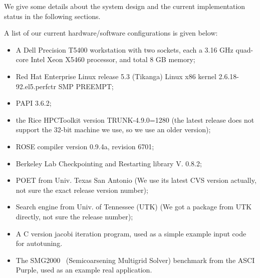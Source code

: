 We give some details about the system design and the current implementation
status in the following sections. 

A list of our current hardware/software configurations is given below:
\begin{itemize}
   \item A Dell Precision T5400 workstation with two sockets, each a 3.16
   GHz quad-core Intel Xeon X5460 processor, and total 8 GB memory; 
   \item Red Hat Enterprise Linux release 5.3 (Tikanga) Linux x86 kernel
   2.6.18-92.el5.perfctr SMP PREEMPT;
   \item PAPI 3.6.2;
   \item the Rice HPCToolkit version TRUNK-4.9.0=1280 (the latest
         release does not support the 32-bit machine we use, so we use an
         older version); 
   \item ROSE compiler version 0.9.4a, revision 6701;
   \item Berkeley Lab Checkpointing and Restarting library V. 0.8.2;
   \item POET from Univ. Texas San Antonio (We use its latest CVS version
         actually, not sure the exact release version number);
   \item Search engine from Univ. of Tennessee (UTK) (We got a package from
         UTK directly, not sure the release number); 
   \item A C version jacobi iteration program, used as a simple example
   input code for autotuning.      

   \item The SMG2000~\cite{BrownSemicoarsening2000} (Semicoarsening Multigrid
         Solver) benchmark from the ASCI Purple, used as an example real
         application.
\end{itemize}


